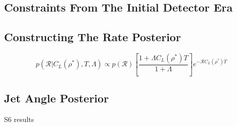 \documentclass[a0,landscape]{a0poster}
\newcommand{\cbcrate}{{{\mathcal R}}}
\newcommand{\rhostar}{{\rho^*}}
\begin{document}
\begin{multicols}{4}
\section*{Constraints From The Initial Detector Era}

\subsection*{Constructing The Rate Posterior}
\begin{equation}\label{eq:loudestEventPosterior}
p(\cbcrate | C_L({\rhostar}), T, \Lambda) \propto p(\cbcrate) \left[ \frac{1+\Lambda
C_L(\rhostar) T}{1+\Lambda}\right] e^{-\cbcrate C_L(\rhostar) T}
\end{equation}


\subsection*{Jet Angle Posterior}


  \begin{minipage}{\columnwidth}
    \makeatletter
    \newcommand{\@captype}{figure}
    \makeatother
    \centering
    \qquad%
    \caption{S6 results}
  \end{minipage}


\end{multicols}
\end{document}
